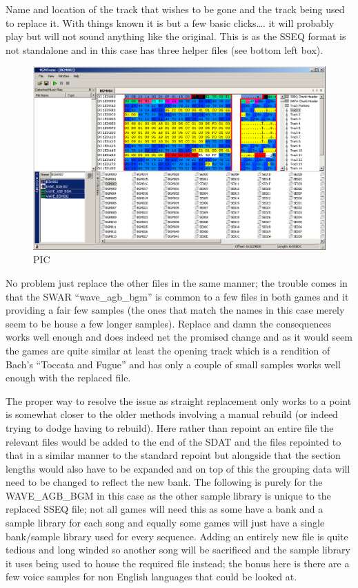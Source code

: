 \documentclass[
]{book}
\begin{document}
Name and location of the track that wishes to be gone and the track being used to replace it. With things known it is but a few basic clicks\ldots. it will probably play but will not sound anything like the original. This is as the SSEQ format is not standalone and in this case has three helper files (see bottom left box).

\begin{figure}
\centering
\includegraphics{images/145_home_fast6191_romhackingguide_unrenamed_fil___inal_borders_romhackingguidesdatinjection_2.png}
\caption{PIC}
\end{figure}

No problem just replace the other files in the same manner; the trouble comes in that the SWAR ``wave\_agb\_bgm'' is common to a few files in both games and it providing a fair few samples (the ones that match the names in this case merely seem to be house a few longer samples). Replace and damn the consequences works well enough and does indeed net the promised change and as it would seem the games are quite similar at least the opening track which is a rendition of Bach's ``Toccata and Fugue'' and has only a couple of small samples works well enough with the replaced file.

The proper way to resolve the issue as straight replacement only works to a point is somewhat closer to the older methods involving a manual rebuild (or indeed trying to dodge having to rebuild). Here rather than repoint an entire file the relevant files would be added to the end of the SDAT and the files repointed to that in a similar manner to the standard repoint but alongside that the section lengths would also have to be expanded and on top of this the grouping data will need to be changed to reflect the new bank. The following is purely for the WAVE\_AGB\_BGM in this case as the other sample library is unique to the replaced SSEQ file; not all games will need this as some have a bank and a sample library for each song and equally some games will just have a single bank/sample library used for every sequence. Adding an entirely new file is quite tedious and long winded so another song will be sacrificed and the sample library it uses being used to house the required file instead; the bonus here is there are a few voice samples for non English languages that could be looked at.
\end{document}
